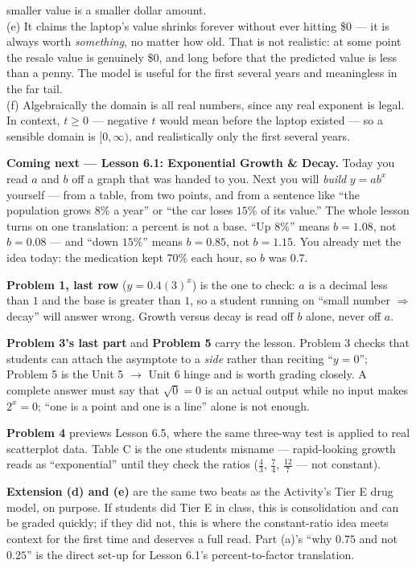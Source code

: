 \documentclass[10pt]{article}
\begin{document}
\begin{extensionbox}
{smaller value is a smaller dollar amount.\\[3pt]
(e) It claims the laptop's value shrinks forever without ever hitting \$$0$ --- it is always worth
\emph{something}, no matter how old. That is not realistic: at some point the resale value is
genuinely \$$0$, and long before that the predicted value is less than a penny. The model is useful
for the first several years and meaningless in the far tail.\\[3pt]
(f) Algebraically the domain is all real numbers, since any real exponent is legal. In context, $t\ge
0$ --- negative $t$ would mean before the laptop existed --- so a sensible domain is $[0,\infty)$,
and realistically only the first several years.}
\end{extensionbox}

\begin{spiralbox}
\textbf{Coming next --- Lesson 6.1: Exponential Growth \& Decay.} Today you read $a$ and $b$ off a
graph that was handed to you. Next you will \emph{build} $y=ab^{x}$ yourself --- from a table, from
two points, and from a sentence like ``the population grows $8\%$ a year'' or ``the car loses $15\%$
of its value.'' The whole lesson turns on one translation: a percent is not a base. ``Up $8\%$''
means $b=1.08$, not $b=0.08$ --- and ``down $15\%$'' means $b=0.85$, not $b=1.15$. You already met
the idea today: the medication kept $70\%$ each hour, so $b$ was $0.7$.
\end{spiralbox}

\begin{teachernote}
\textbf{Problem 1, last row} ($y=0.4(3)^{x}$) is the one to check: $a$ is a decimal less than $1$ and
the base is greater than $1$, so a student running on ``small number $\Rightarrow$ decay'' will
answer wrong. Growth versus decay is read off $b$ alone, never off $a$.

\textbf{Problem 3's last part} and \textbf{Problem 5} carry the lesson. Problem 3 checks that
students can attach the asymptote to a \emph{side} rather than reciting ``$y=0$''; Problem 5 is the
Unit 5 $\rightarrow$ Unit 6 hinge and is worth grading closely. A complete answer must say that
$\sqrt{0}=0$ is an actual output while no input makes $2^{x}=0$; ``one is a point and one is a line''
alone is not enough.

\textbf{Problem 4} previews Lesson 6.5, where the same three-way test is applied to real scatterplot
data. Table C is the one students misname --- rapid-looking growth reads as ``exponential'' until
they check the ratios ($\frac43$, $\frac74$, $\frac{12}{7}$ --- not constant).

\textbf{Extension (d) and (e)} are the same two beats as the Activity's Tier E drug model, on purpose.
If students did Tier E in class, this is consolidation and can be graded quickly; if they did not,
this is where the constant-ratio idea meets context for the first time and deserves a full read.
Part (a)'s ``why $0.75$ and not $0.25$'' is the direct set-up for Lesson 6.1's percent-to-factor
translation.
\end{teachernote}
\end{document}
